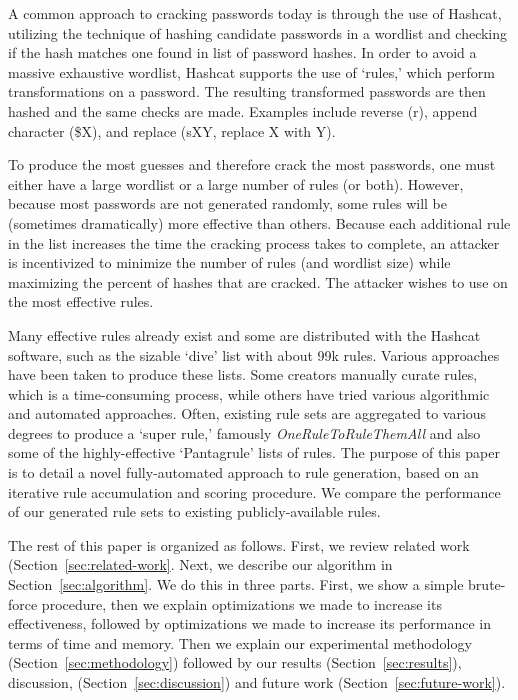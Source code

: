 \documentclass[letterpaper,twocolumn,10pt]{article}
\begin{document}
A common approach to cracking passwords today is through the use of Hashcat,
utilizing the technique of hashing candidate passwords in a wordlist and
checking if the hash matches one found in list of password hashes. In order to avoid a massive exhaustive
wordlist, Hashcat supports the use of `rules,' which perform
transformations on a password. The resulting transformed passwords are then hashed and the same
checks are made. Examples include reverse (r), append character (\$X), and
replace (sXY, replace X with Y).\cite{hashcat}


To produce the most guesses and therefore crack the most passwords, one must either have a large wordlist or a large number of rules (or both). However, because
most passwords are not generated randomly, some rules will be
(sometimes dramatically) more effective than others. Because each additional
rule in the list increases the time the cracking process takes to complete, an
attacker is incentivized to minimize the number of rules (and wordlist size) while maximizing the percent of hashes that are cracked. The attacker wishes to use on the most effective rules.


Many effective rules already exist and some are distributed with the
Hashcat software, such as the sizable `dive' list with about 99k rules. Various approaches have
been taken to produce these lists. Some creators manually curate rules, which
is a time-consuming process, while others have tried various algorithmic and
automated approaches. Often, existing rule sets are aggregated to various
degrees to produce a `super rule,' famously \textit{OneRuleToRuleThemAll} and
also some of the highly-effective `Pantagrule' lists of
rules.\cite{ortrta,pantagrule} The purpose of this paper is to detail a
novel fully-automated approach to rule generation, based on an iterative rule accumulation and scoring procedure. We compare the performance of our generated rule sets to existing publicly-available rules.

The rest of this paper is organized as follows. First, we review related work (Section~\ref{sec:related-work}. Next, we describe our algorithm in Section~\ref{sec:algorithm}. We do this in three parts. First, we show a simple brute-force procedure, then we explain optimizations we made to increase its effectiveness, followed by optimizations we made to increase its performance in terms of time and memory. Then we explain our experimental methodology (Section~\ref{sec:methodology}) followed by our results (Section~\ref{sec:results}), discussion, (Section~\ref{sec:discussion}) and future work (Section~\ref{sec:future-work}).
\end{document}
